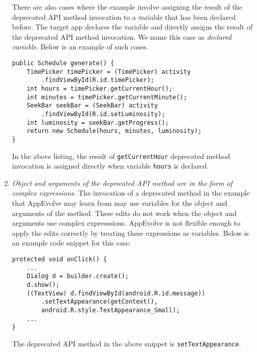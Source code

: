 \begin{enumerate}
There are also cases where the example involve assigning the result of the deprecated API method invocation to a variable that has been declared before. The target app declares the variable and directly assigns the result of the deprecated API method invocation. We name this case as {\em declared variable}. Below is an example of such cases.
\begin{lstlisting}[language=text,numbers=none,caption=The result of a deprecated method is assigned directly to a variable,captionpos=b, label=lst:indirectassign]
public Schedule generate() {
    TimePicker timePicker = (TimePicker) activity
        .findViewById(R.id.timePicker);
    int hours = timePicker.getCurrentHour();
    int minutes = timePicker.getCurrentMinute();
    SeekBar seekBar = (SeekBar) activity
        .findViewById(R.id.setLuminosity);
    int luminosity = seekBar.getProgress();
    return new Schedule(hours, minutes, luminosity);
}
\end{lstlisting}
In the above listing, the result of {\tt getCurrentHour} deprecated method invocation is assigned directly when variable {\tt hours} is declared. 

\item {\em Object and arguments of the deprecated API method are in the form of complex expressions.} The invocation of a deprecated method in the example that AppEvolve may learn from may use variables for the object and arguments of the method. These edits do not work when the object and arguments use complex expresssions. AppEvolve is not flexible enough to apply the edits correctly by treating these expressions as variables. Below is an example code snippet for this case.
\begin{lstlisting}[language=text,numbers=none,caption=Complex expressions representing an object that is calling the deprecated method,captionpos=b, label=lst:complexexpress]
protected void onClick() {
    ...
    Dialog d = builder.create();
    d.show();
    ((TextView) d.findViewById(android.R.id.message))
        .setTextAppearance(getContext(), 
        android.R.style.TextAppearance_Small);
    ...
}
\end{lstlisting}
The deprecated API method in the above snippet is {\tt setTextAppearance}.



\end{enumerate}
